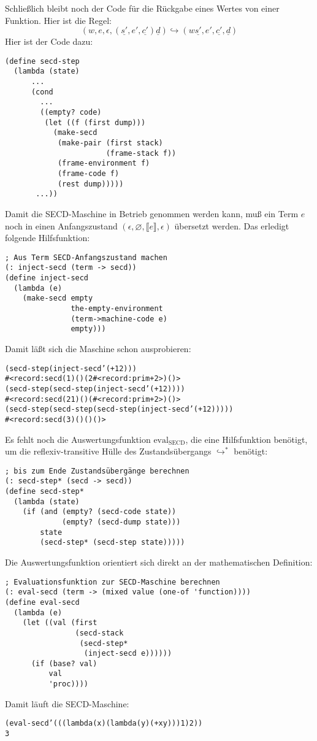 %
Schließlich bleibt noch der Code für die Rückgabe eines Wertes von
einer Funktion.  Hier ist die Regel:
%
\begin{displaymath}
  (w, e, \epsilon, (\underline{s'}, e', \underline{c'}) \underline{d})
  \hookrightarrow
  (w\underline{s'}, e', \underline{c'}, \underline{d})
\end{displaymath}
%
Hier ist der Code dazu:
%
\begin{verbatim}
(define secd-step
  (lambda (state)
      ...
      (cond
        ...
        ((empty? code)
         (let ((f (first dump)))
           (make-secd
            (make-pair (first stack)
                       (frame-stack f))
            (frame-environment f)
            (frame-code f)
            (rest dump)))))
       ...))
\end{verbatim}
%
Damit die SECD-Maschine in Betrieb genommen werden kann, muß ein Term
$e$ noch in einen Anfangszustand $(\epsilon, \varnothing, \llbracket
e\rrbracket, \epsilon)$ übersetzt werden.  Das erledigt folgende
Hilfsfunktion:
%
\begin{verbatim}
; Aus Term SECD-Anfangszustand machen
(: inject-secd (term -> secd))
(define inject-secd
  (lambda (e)
    (make-secd empty
               the-empty-environment
               (term->machine-code e)
               empty)))
\end{verbatim}
%
Damit läßt sich die Maschine schon ausprobieren:
%
\begin{alltt}
(secd-step (inject-secd '(+ 1 2)))
\evalsto{}#<record:secd (1) () (2 #<record:prim + 2>) ()>
(secd-step (secd-step (inject-secd '(+ 1 2))))
\evalsto{}#<record:secd (2 1) () (#<record:prim + 2>) ()>
(secd-step (secd-step (secd-step (inject-secd '(+ 1 2)))))
\evalsto{}#<record:secd (3) () () ()>
\end{alltt}
%
Es fehlt noch die Auswertungsfunktion $\mathrm{eval}_\mathrm{SECD}$,
die eine Hilfsfunktion benötigt, um die reflexiv-transitive Hülle des
Zustandsübergangs $\hookrightarrow^*$ benötigt:
%
\begin{verbatim}
; bis zum Ende Zustandsübergänge berechnen
(: secd-step* (secd -> secd))
(define secd-step*
  (lambda (state)
    (if (and (empty? (secd-code state))
             (empty? (secd-dump state)))
        state
        (secd-step* (secd-step state)))))
\end{verbatim}
%
Die Auswertungsfunktion orientiert sich direkt an der mathematischen
Definition:
%
\begin{verbatim}
; Evaluationsfunktion zur SECD-Maschine berechnen
(: eval-secd (term -> (mixed value (one-of 'function))))
(define eval-secd
  (lambda (e)
    (let ((val (first
                (secd-stack
                 (secd-step* 
                  (inject-secd e))))))
      (if (base? val)
          val
          'proc))))
\end{verbatim}
%
Damit läuft die SECD-Maschine:
%
\begin{alltt}
(eval-secd '(((lambda (x) (lambda (y) (+ x y))) 1) 2))
\evalsto{}3
\end{alltt}

